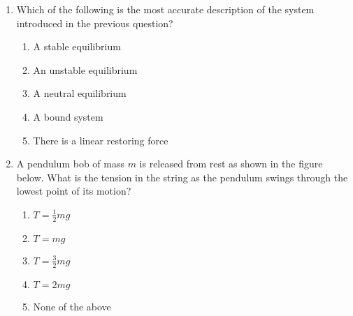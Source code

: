 \documentclass{../../../oss-apphys}
\begin{document}
\begin{multicols}{2}
\begin{enumerate}[resume,leftmargin=18pt]
  \item Which of the following is the most accurate description of the system
    introduced in the previous question?
    \label{q:well2}
    \begin{enumerate}[nosep,leftmargin=18pt,label=(\Alph*)]
    \item A stable equilibrium
    \item An unstable equilibrium
    \item A neutral equilibrium
    \item A bound system
    \item There is a linear restoring force
    \end{enumerate}
    \columnbreak
    
  \item A pendulum bob of mass $m$ is released from rest as shown in the figure
    below. What is the tension in the string as the pendulum swings through the
    lowest point of its motion?
    \begin{center}
    \end{center}
    \begin{enumerate}[nosep,leftmargin=18pt,label=(\Alph*)]
    \item $\displaystyle T=\frac{1}{2}mg$
    \item $T=mg$
    \item $\displaystyle T=\frac{3}{2}mg$
    \item $T=2mg$
    \item None of the above
    \end{enumerate}
    \vspace{.7in}
    

\end{enumerate}
\end{multicols}
\end{document}
